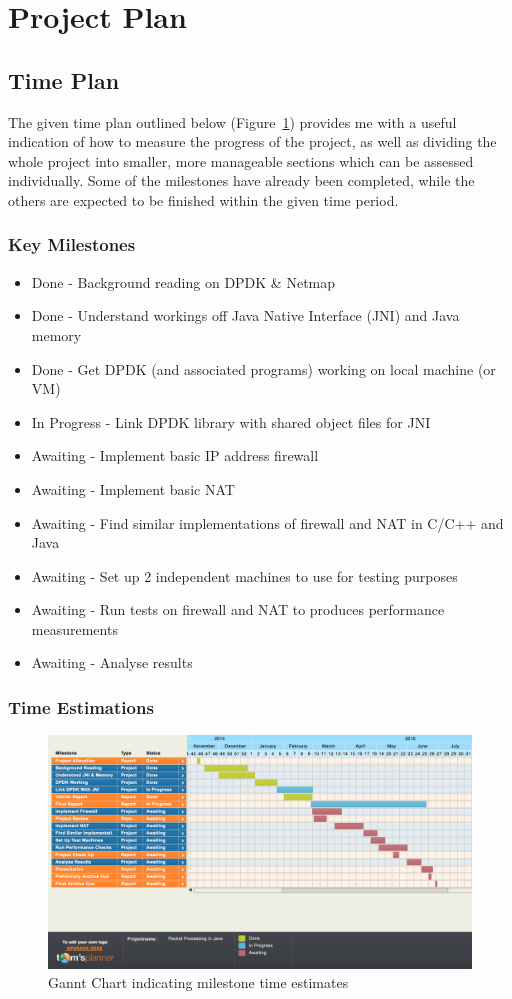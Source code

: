 \documentclass[interim_report.tex]{subfiles}
\begin{document}
\section{Project Plan}
\subsection{Time Plan}
The given time plan outlined below (Figure~\ref{fig:gannt}) provides me with a useful indication of how to measure the progress of the project, as well as dividing the whole project into smaller, more manageable sections which can be assessed individually. Some of the milestones have already been completed, while the others are expected to be finished within the given time period.
\subsubsection{Key Milestones}
\begin{itemize}
	\item Done - Background reading on DPDK \& Netmap
	\item Done - Understand workings off Java Native Interface (JNI) and Java memory
	\item Done - Get DPDK (and associated programs) working on local machine (or VM)
	\item In Progress - Link DPDK library with shared object files for JNI
	\item Awaiting - Implement basic IP address firewall
	\item Awaiting - Implement basic NAT
	\item Awaiting - Find similar implementations of firewall and NAT in C/C++ and Java
	\item Awaiting - Set up 2 independent machines to use for testing purposes
	\item Awaiting - Run tests on firewall and NAT to produces performance measurements
	\item Awaiting - Analyse results
\end{itemize}

\subsubsection{Time Estimations}
\begin{figure}[H]
	\centering
	\includegraphics[width=\textwidth]{img/timeline.png}
	\caption{Gannt Chart indicating milestone time estimates}
	\label{fig:gannt}
\end{figure}
\end{document}
